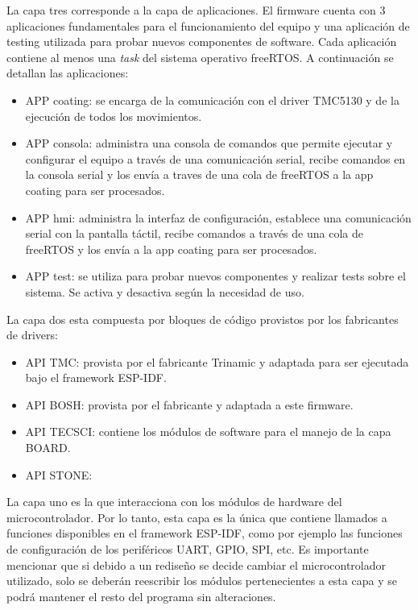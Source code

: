 La capa tres corresponde a la capa de aplicaciones. El firmware cuenta con 3 aplicaciones fundamentales para el funcionamiento del equipo y una aplicación de testing utilizada para probar nuevos componentes de software. Cada aplicación contiene al menos una \textit{task} del sistema operativo freeRTOS. A continuación se detallan las aplicaciones:

\begin{itemize}

\item APP coating: se encarga de la comunicación con el driver TMC5130 y de la ejecución de todos los movimientos.
\item APP consola: administra una consola de comandos que permite ejecutar y configurar el equipo a través de una comunicación serial, recibe comandos en la consola serial y los envía a traves de una cola de freeRTOS a la app coating para ser procesados.
\item APP hmi: administra la interfaz de configuración, establece una comunicación serial con la pantalla táctil, recibe comandos a través de una cola de freeRTOS y los envía a la app coating para ser procesados.
\item APP test: se utiliza para probar nuevos componentes y realizar tests sobre el sistema. Se activa y desactiva según la necesidad de uso.

\end{itemize}

La capa dos esta compuesta por bloques de código provistos por los fabricantes de drivers:
\begin{itemize}
\item API TMC: provista por el fabricante Trinamic y adaptada para ser ejecutada bajo el framework ESP-IDF.
\item API BOSH: provista por el fabricante y adaptada a este firmware.
\item API TECSCI: contiene los módulos de software para el manejo de la capa BOARD.
\item API STONE:
\end{itemize}

La capa uno es la que interacciona con los módulos de hardware del microcontrolador. Por lo tanto, esta capa es la única que contiene llamados a funciones disponibles en el framework ESP-IDF, como por ejemplo las funciones de configuración de los periféricos UART, GPIO, SPI, etc. Es importante mencionar que si debido a un rediseño se decide cambiar el microcontrolador utilizado, solo se deberán reescribir los módulos pertenecientes a esta capa y se podrá mantener el resto del programa sin alteraciones.

